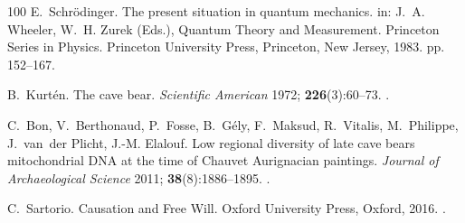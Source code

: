 \documentclass{ws-ijmpb}
\begin{document}
\begin{thebibliography}{100}
E.~Schr\"{o}dinger. The present situation in quantum mechanics. in: J.~A.
  Wheeler, W.~H. Zurek (Eds.), Quantum Theory and Measurement. Princeton Series
  in Physics. Princeton University Press, Princeton, New Jersey, 1983. pp.
  152--167.

B.~Kurt\'{e}n. The cave bear. \emph{Scientific American} 1972;
  \textbf{226}(3):60--73.
\newblock \href {http://doi.org/10.1038/scientificamerican0372-60}
  {}.

C.~Bon, V.~Berthonaud, P.~Fosse, B.~G\'{e}ly, F.~Maksud, R.~Vitalis,
  M.~Philippe, J.~van~der Plicht, J.-M. Elalouf. Low regional diversity of late
  cave bears mitochondrial {DNA} at the time of {C}hauvet {A}urignacian
  paintings. \emph{Journal of Archaeological Science} 2011;
  \textbf{38}(8):1886--1895.
\newblock \href {http://doi.org/10.1016/j.jas.2011.03.033}
  {}.

C.~Sartorio. Causation and Free Will. Oxford University Press, Oxford, 2016.
\newblock \href {http://doi.org/10.1093/acprof:oso/9780198746799.001.0001}
  {}.

\end{thebibliography}
\end{document}
